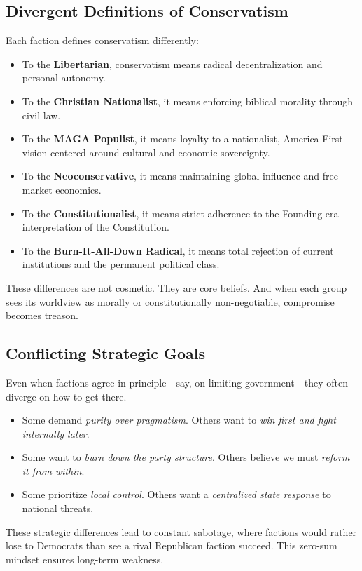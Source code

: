 \subsection{Divergent Definitions of Conservatism}
Each faction defines conservatism differently:
\begin{itemize}
\item To the \textbf{Libertarian}, conservatism means radical decentralization and personal autonomy.
\item To the \textbf{Christian Nationalist}, it means enforcing biblical morality through civil law.
\item To the \textbf{MAGA Populist}, it means loyalty to a nationalist, America First vision centered around cultural and economic sovereignty.
\item To the \textbf{Neoconservative}, it means maintaining global influence and free-market economics.
\item To the \textbf{Constitutionalist}, it means strict adherence to the Founding-era interpretation of the Constitution.
\item To the \textbf{Burn-It-All-Down Radical}, it means total rejection of current institutions and the permanent political class.
\end{itemize}

These differences are not cosmetic. They are core beliefs. And when each group sees its worldview as morally or constitutionally non-negotiable, compromise becomes treason.

\subsection{Conflicting Strategic Goals}
Even when factions agree in principle—say, on limiting government—they often diverge on how to get there.
\begin{itemize}
\item Some demand \textit{purity over pragmatism}. Others want to \textit{win first and fight internally later}.
\item Some want to \textit{burn down the party structure}. Others believe we must \textit{reform it from within}.
\item Some prioritize \textit{local control}. Others want a \textit{centralized state response} to national threats.
\end{itemize}

These strategic differences lead to constant sabotage, where factions would rather lose to Democrats than see a rival Republican faction succeed. This zero-sum mindset ensures long-term weakness.

